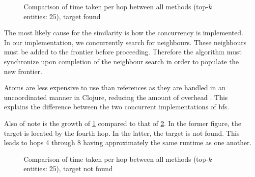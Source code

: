 				\begin{figure}[H]
					\centering
					
					
					\caption{Comparison of time taken per hop between all methods (top-\(k\) entities:  25), target found}
					\label{fig:method-runtime-tkes-25-stopsat4}
				\end{figure}
				
				The most likely cause for the similarity is how the concurrency is implemented.  In our implementation, we concurrently search for neighbours.  These neighbours must be added to the frontier before proceeding.  Therefore the algorithm must synchronize upon completion of the neighbour search in order to populate the new frontier.
				
				Atoms are less expensive to use than references as they are handled in an uncoordinated manner in Clojure, reducing the amount of overhead \cite{narkis-12}.  This explains the difference between the two concurrent implementations of \gls{bfs}.
				
				
				Also of note is the growth of \cref{fig:method-runtime-tkes-25-stopsat4} compared to that of \cref{fig:method-runtime-tkes-25}.  In the former figure, the target is located by the fourth hop.  In the latter, the target is not found.  This leads to hops 4 through 8 having approximately the same runtime as one another.
				
				\begin{figure}[H]
					\centering
					
					
					\caption{Comparison of time taken per hop between all methods (top-\(k\) entities:  25), target not found}
					\label{fig:method-runtime-tkes-25}
				\end{figure}
	

